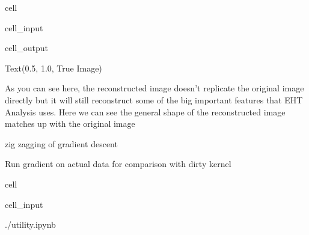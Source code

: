 \documentclass[letterpaper,10pt,english]{jupyterBook}
\begin{document}
\begin{sphinxuseclass}{cell}\begin{sphinxVerbatimInput}

\begin{sphinxuseclass}{cell_input}
\begin{sphinxVerbatim}[commandchars=\\\{\}]
  
\end{sphinxVerbatim}

\end{sphinxuseclass}\end{sphinxVerbatimInput}
\begin{sphinxVerbatimOutput}

\begin{sphinxuseclass}{cell_output}
\begin{sphinxVerbatim}[commandchars=\\\{\}]
Text(0.5, 1.0, \PYGZsq{}True Image\PYGZsq{})
\end{sphinxVerbatim}

\noindent{}

\end{sphinxuseclass}\end{sphinxVerbatimOutput}

\end{sphinxuseclass}
\sphinxAtStartPar
As you can see here, the reconstructed image doesn’t replicate the original image directly but it will still reconstruct some of the big important features that EHT Analysis uses. Here we can see the general shape of the reconstructed image matches up with the original image

\sphinxAtStartPar
zig zagging of gradient descent

\sphinxAtStartPar
Run gradient on actual data for comparison with dirty kernel

\sphinxstepscope

\begin{sphinxuseclass}{cell}\begin{sphinxVerbatimInput}

\begin{sphinxuseclass}{cell_input}
\begin{sphinxVerbatim}[commandchars=\\\{\}]
 ./utility.ipynb
\end{sphinxVerbatim}

\end{sphinxuseclass}\end{sphinxVerbatimInput}

\end{sphinxuseclass}
\end{document}
